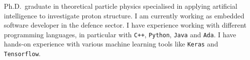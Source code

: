 

\begin{cvparagraph}

Ph.D.\ graduate in theoretical particle physics specialised in applying artificial intelligence to investigate
proton structure.
I am currently working as embedded software developer in the defence sector.
I have experience working with different programming languages, in particular with \texttt{C++}, \texttt{Python}, \texttt{Java} and \texttt{Ada}.
I have hands-on experience with various machine learning tools like \texttt{Keras} and \texttt{Tensorflow}.
\end{cvparagraph}